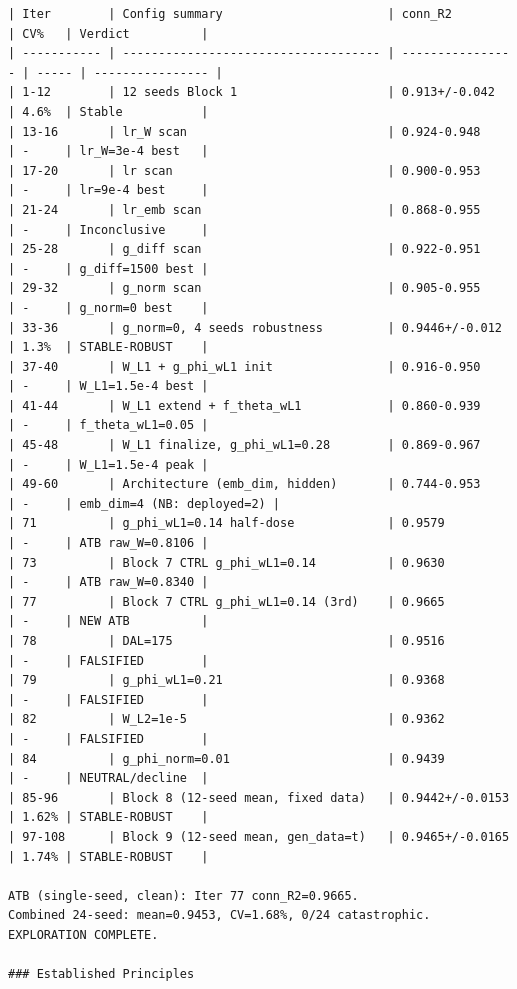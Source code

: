 \documentclass{article}
\begin{document}
\begin{tiny}
\begin{verbatim}
| Iter        | Config summary                       | conn_R2          | CV%   | Verdict          |
| ----------- | ------------------------------------ | ---------------- | ----- | ---------------- |
| 1-12        | 12 seeds Block 1                     | 0.913+/-0.042    | 4.6%  | Stable           |
| 13-16       | lr_W scan                            | 0.924-0.948      | -     | lr_W=3e-4 best   |
| 17-20       | lr scan                              | 0.900-0.953      | -     | lr=9e-4 best     |
| 21-24       | lr_emb scan                          | 0.868-0.955      | -     | Inconclusive     |
| 25-28       | g_diff scan                          | 0.922-0.951      | -     | g_diff=1500 best |
| 29-32       | g_norm scan                          | 0.905-0.955      | -     | g_norm=0 best    |
| 33-36       | g_norm=0, 4 seeds robustness         | 0.9446+/-0.012   | 1.3%  | STABLE-ROBUST    |
| 37-40       | W_L1 + g_phi_wL1 init                | 0.916-0.950      | -     | W_L1=1.5e-4 best |
| 41-44       | W_L1 extend + f_theta_wL1            | 0.860-0.939      | -     | f_theta_wL1=0.05 |
| 45-48       | W_L1 finalize, g_phi_wL1=0.28        | 0.869-0.967      | -     | W_L1=1.5e-4 peak |
| 49-60       | Architecture (emb_dim, hidden)       | 0.744-0.953      | -     | emb_dim=4 (NB: deployed=2) |
| 71          | g_phi_wL1=0.14 half-dose             | 0.9579           | -     | ATB raw_W=0.8106 |
| 73          | Block 7 CTRL g_phi_wL1=0.14          | 0.9630           | -     | ATB raw_W=0.8340 |
| 77          | Block 7 CTRL g_phi_wL1=0.14 (3rd)    | 0.9665           | -     | NEW ATB          |
| 78          | DAL=175                              | 0.9516           | -     | FALSIFIED        |
| 79          | g_phi_wL1=0.21                       | 0.9368           | -     | FALSIFIED        |
| 82          | W_L2=1e-5                            | 0.9362           | -     | FALSIFIED        |
| 84          | g_phi_norm=0.01                      | 0.9439           | -     | NEUTRAL/decline  |
| 85-96       | Block 8 (12-seed mean, fixed data)   | 0.9442+/-0.0153  | 1.62% | STABLE-ROBUST    |
| 97-108      | Block 9 (12-seed mean, gen_data=t)   | 0.9465+/-0.0165  | 1.74% | STABLE-ROBUST    |

ATB (single-seed, clean): Iter 77 conn_R2=0.9665.
Combined 24-seed: mean=0.9453, CV=1.68%, 0/24 catastrophic. EXPLORATION COMPLETE.

### Established Principles


\end{verbatim}
\end{tiny}
\end{document}

